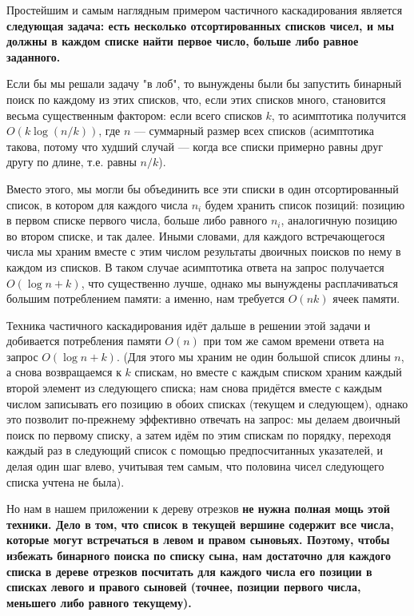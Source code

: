 Простейшим и самым наглядным примером частичного каскадирования является \bf{следующая задача}: есть несколько отсортированных списков чисел, и мы должны в каждом списке найти первое число, больше либо равное заданного.

Если бы мы решали задачу "в лоб", то вынуждены были бы запустить бинарный поиск по каждому из этих списков, что, если этих списков много, становится весьма существенным фактором: если всего списков $k$, то асимптотика получится $O (k \log(n/k))$, где $n$ --- суммарный размер всех списков (асимптотика такова, потому что худший случай --- когда все списки примерно равны друг другу по длине, т.е. равны $n/k$).

Вместо этого, мы могли бы объединить все эти списки в один отсортированный список, в котором для каждого числа $n_i$ будем хранить список позиций: позицию в первом списке первого числа, больше либо равного $n_i$, аналогичную позицию во втором списке, и так далее. Иными словами, для каждого встречающегося числа мы храним вместе с этим числом результаты двоичных поисков по нему в каждом из списков. В таком случае асимптотика ответа на запрос получается $O (\log n + k)$, что существенно лучше, однако мы вынуждены расплачиваться большим потреблением памяти: а именно, нам требуется $O (nk)$ ячеек памяти.

Техника частичного каскадирования идёт дальше в решении этой задачи и добивается потребления памяти $O (n)$ при том же самом времени ответа на запрос $O (\log n + k)$. (Для этого мы храним не один большой список длины $n$, а снова возвращаемся к $k$ спискам, но вместе с каждым списком храним каждый второй элемент из следующего списка; нам снова придётся вместе с каждым числом записывать его позицию в обоих списках (текущем и следующем), однако это позволит по-прежнему эффективно отвечать на запрос: мы делаем двоичный поиск по первому списку, а затем идём по этим спискам по порядку, переходя каждый раз в следующий список с помощью предпосчитанных указателей, и делая один шаг влево, учитывая тем самым, что половина чисел следующего списка учтена не была).

Но нам в нашем приложении к дереву отрезков \bf{не нужна} полная мощь этой техники. Дело в том, что список в текущей вершине содержит все числа, которые могут встречаться в левом и правом сыновьях. Поэтому, чтобы избежать бинарного поиска по списку сына, нам достаточно для каждого списка в дереве отрезков посчитать для каждого числа его позиции в списках левого и правого сыновей (точнее, позиции первого числа, меньшего либо равного текущему).

